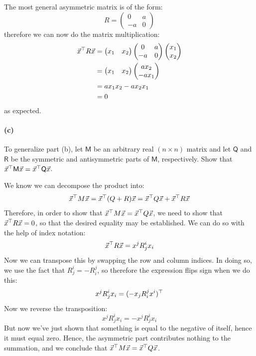 \documentclass{article}
\begin{document}
\begin{solution}
	The most general asymmetric matrix is of the form: 
	\[
		R = \begin{pmatrix} 0 & a \\ -a & 0 \end{pmatrix} 
	\] 
	therefore we can now do the matrix multiplication:
	\begin{align*}
		\vec x^\top R \vec x &= \begin{pmatrix} x_1 & x_2  \end{pmatrix} 
		\begin{pmatrix} 0 & a \\ -a & 0 \end{pmatrix} \begin{pmatrix} x_1 \\ x_2 \end{pmatrix} \\
						  &= \begin{pmatrix} x_1 & x_2 \end{pmatrix} 
						  \begin{pmatrix} ax_2 \\ -ax_1 \end{pmatrix}  \\
						  &= ax_1x_2 - ax_2x_1  \\
						  &=  0 
	\end{align*}
	as expected. 
\end{solution}

\paragraph{(c)}
To generalize part (b), let $\mathsf{M}$ be an arbitrary real $(n\times n)$ matrix and let $\mathsf{Q}$ and $\mathsf{R}$ be the symmetric and antisymmetric parts of $\mathsf{M}$, respectively.  
Show that $\vec{x}^{\top}\mathsf{M}\vec{x} = \vec{x}^{\top}\mathsf{Q}\vec{x}$.


\begin{solution}
	We know we can decompose the product into:
	\[
	\vec x^\top M \vec x = \vec x^\top( Q + R) \vec x = \vec x^\top Q \vec x + \vec x^\top R \vec x
	\] 
	Therefore, in order to show that $\vec x^\top M \vec x = \vec x^\top Q \vec x$, we need to show that $\vec x^\top
	R \vec x = 0$, so that the desired equality may be established. We can do so with the help of index 
	notation: 
	\[
	\vec x^\top R \vec x = x^j R^i_j x_i 
	\] 
	Now we can transpose this by swapping the row and column indices. In doing so, we use the fact that 
	$R^i_j = -R^j_i$, so therefore the expression flips sign when we do this:
	\[
	x^j R^i_j x_i = (-x_jR^j_i x^i)^\top
	\] 
	Now we reverse the transposition:
	\[
	x^j R^i_j x_i = -x^j R^i_j x_i
	\] 
	But now we've just shown that something is equal to the negative of itself, hence it must equal zero. Hence,
	the asymmetric part contributes nothing to the summation, and we conclude that $\vec x^\top M \vec x = 
	\vec x^\top Q \vec x$. 
\end{solution}
\bigskip
\dphline
\pagebreak
\end{document}
